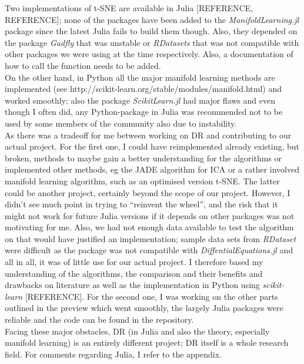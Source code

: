 \documentclass[journal, a4paper]{IEEEtran}
\begin{document}


Two implementations of t-SNE are available in Julia [REFERENCE, REFERENCE]; none of the packages have been added to the \textit{ManifoldLearning.jl} package since the latest Julia fails to build them though. Also, they depended on the package \textit{Gadfly} that was unstable or \textit{RDatasets} that was not compatible with other packages we were using at the time respectively. Also, a documentation of how to call the function needs to be added. \\

On the other hand, in Python all the major manifold learning methods are implemented (see http://scikit-learn.org/stable/modules/manifold.html) and worked smoothly; also the package \textit{ScikitLearn.jl} had major flaws and even though I often did, any Python-package in Julia was recommended not to be used by some members of the community also due to instability. \\

As there was a tradeoff for me between working on DR and contributing to our actual project. 
For the first one, I could have reimplemented already existing, but broken, methods to maybe gain a better understanding for the algorithms or implemented other methods, eg the JADE algorithm for ICA or a rather involved manifold learning algorithm, such as an optimised version t-SNE. The latter could be another project, certainly beyond the scope of our project. However, I didn’t see much point in trying to “reinvent the wheel”, and the risk that it might not work for future Julia versions if it depends on other packages was not motivating for me. Also, we had not enough data available to test the algorithm on that would have justified an implementation; sample data sets from \textit{RDataset} were difficult as the package was not compatible with \textit{DiffentialEquations.jl} and all in all, it was of little use for our actual project. I therefore based my understanding of the algorithms, the comparison and their benefits and drawbacks on literature as well as the implementation in Python using \textit{scikit-learn} [REFERENCE].
For the second one, I was working on the other parts outlined in the preview which went smoothly, the largely Julia packages were reliable and the code can be found in the repository. \\

Facing these major obstacles, DR (in Julia and also the theory, especially manifold learning) is an entirely different project; DR itself is a whole research field. For comments regarding Julia, I refer to the appendix. \\
\end{document}
